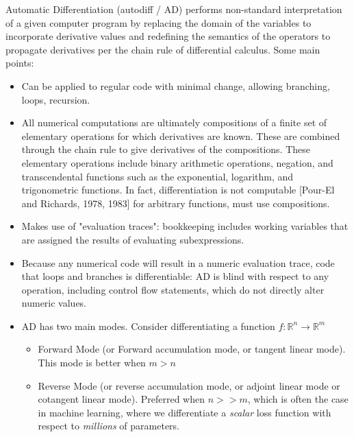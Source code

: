 \documentclass[11pt]{article}
\theoremstyle{definition}
\theoremstyle{plain}
\renewcommand{\b}[1]{\mathbb{#1}}
\begin{document}
\noindent Automatic Differentiation (autodiff / AD) 
performs non-standard interpretation of a given computer program
by replacing the domain of the variables to incorporate derivative values
and redefining the semantics of the operators to propagate derivatives
per the chain rule of differential calculus. Some main points:

\begin{itemize}

\item Can be applied to regular code with minimal change,
allowing branching, loops, recursion. 

\item All numerical computations are ultimately
compositions of a finite set of elementary operations for which derivatives are known.
These are combined through the chain rule to give derivatives of the compositions.
These elementary operations include binary arithmetic operations, negation,
and transcendental functions such as the exponential, logarithm, and trigonometric functions.
In fact, differentiation is not computable [Pour-El and Richards, 1978, 1983] for
arbitrary functions, must use compositions.

\item Makes use of "evaluation traces": bookkeeping includes working variables that are assigned
the results of evaluating subexpressions. 

\item Because any numerical code will result in a numeric evaluation trace, 
code that loops and branches is differentiable: AD is blind with respect to any 
operation, including control flow statements, which do not directly alter numeric values.

\item AD has two main modes. Consider differentiating a function 
$f: \b{R}^n \rightarrow \b{R}^m$
    \begin{itemize}
        \item Forward Mode (or Forward
        accumulation mode, or tangent linear mode).
        This mode is better when $m > n$     

        \item Reverse Mode (or reverse accumulation mode,
        or adjoint linear mode or cotangent linear mode).
        Preferred when $n >> m$, which is often
        the case in machine learning, where we differentiate a \textit{scalar} 
        loss function with respect to \textit{millions} of parameters.
    \end{itemize}
\end{itemize}
\end{document}
